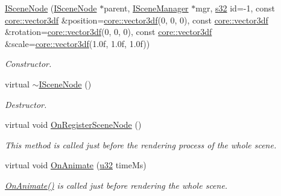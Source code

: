 \begin{DoxyCompactItemize}
\hyperlink{classirr_1_1scene_1_1ISceneNode_a9894d951df2f720924f891e0a7b9fac2}{I\+Scene\+Node} (\hyperlink{classirr_1_1scene_1_1ISceneNode}{I\+Scene\+Node} $\ast$parent, \hyperlink{classirr_1_1scene_1_1ISceneManager}{I\+Scene\+Manager} $\ast$mgr, \hyperlink{namespaceirr_ac66849b7a6ed16e30ebede579f9b47c6}{s32} id=-\/1, const \hyperlink{namespaceirr_1_1core_ae6e2b2a6c552833ebbd5b7463d03586b}{core\+::vector3df} \&position=\hyperlink{namespaceirr_1_1core_ae6e2b2a6c552833ebbd5b7463d03586b}{core\+::vector3df}(0, 0, 0), const \hyperlink{namespaceirr_1_1core_ae6e2b2a6c552833ebbd5b7463d03586b}{core\+::vector3df} \&rotation=\hyperlink{namespaceirr_1_1core_ae6e2b2a6c552833ebbd5b7463d03586b}{core\+::vector3df}(0, 0, 0), const \hyperlink{namespaceirr_1_1core_ae6e2b2a6c552833ebbd5b7463d03586b}{core\+::vector3df} \&scale=\hyperlink{namespaceirr_1_1core_ae6e2b2a6c552833ebbd5b7463d03586b}{core\+::vector3df}(1.\+0f, 1.\+0f, 1.\+0f))
\begin{DoxyCompactList}\small\item\em Constructor. \end{DoxyCompactList}\item 
\mbox{\label{classirr_1_1scene_1_1ISceneNode_a3064ed436d731f072e55873577724fbc}} 
virtual \hyperlink{classirr_1_1scene_1_1ISceneNode_a3064ed436d731f072e55873577724fbc}{$\sim$\+I\+Scene\+Node} ()
\begin{DoxyCompactList}\small\item\em Destructor. \end{DoxyCompactList}\item 
virtual void \hyperlink{classirr_1_1scene_1_1ISceneNode_ac9795bfcb88dcaf8cba6ea3296e5d8d0}{On\+Register\+Scene\+Node} ()
\begin{DoxyCompactList}\small\item\em This method is called just before the rendering process of the whole scene. \end{DoxyCompactList}\item 
virtual void \hyperlink{classirr_1_1scene_1_1ISceneNode_afc1dcb5cb19116d0c7aa3d4ebdf04cc5}{On\+Animate} (\hyperlink{namespaceirr_a0416a53257075833e7002efd0a18e804}{u32} time\+Ms)
\begin{DoxyCompactList}\small\item\em \hyperlink{classirr_1_1scene_1_1ISceneNode_afc1dcb5cb19116d0c7aa3d4ebdf04cc5}{On\+Animate()} is called just before rendering the whole scene. \end{DoxyCompactList}\item 

\end{DoxyCompactItemize}
